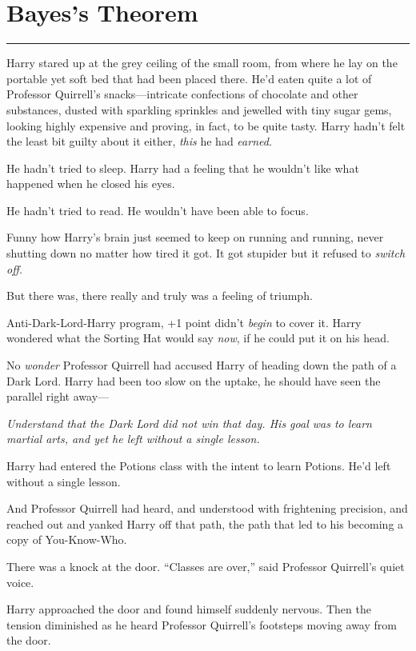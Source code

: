 \chapter{Bayes's Theorem}

\begin{center}\rule{3in}{0.4pt}\end{center}

Harry stared up at the grey ceiling of the small room, from where he lay
on the portable yet soft bed that had been placed there. He'd eaten
quite a lot of Professor Quirrell's snacks---intricate confections of
chocolate and other substances, dusted with sparkling sprinkles and
jewelled with tiny sugar gems, looking highly expensive and proving, in
fact, to be quite tasty. Harry hadn't felt the least bit guilty about it
either, \emph{this} he had \emph{earned}.

He hadn't tried to sleep. Harry had a feeling that he wouldn't like what
happened when he closed his eyes.

He hadn't tried to read. He wouldn't have been able to focus.

Funny how Harry's brain just seemed to keep on running and running,
never shutting down no matter how tired it got. It got stupider but it
refused to \emph{switch off.}

But there was, there really and truly was a feeling of triumph.

Anti-Dark-Lord-Harry program, +1 point didn't \emph{begin} to cover it.
Harry wondered what the Sorting Hat would say \emph{now}, if he could
put it on his head.

No \emph{wonder} Professor Quirrell had accused Harry of heading down
the path of a Dark Lord. Harry had been too slow on the uptake, he
should have seen the parallel right away---

\emph{Understand that the Dark Lord did not win that day. His goal was
to learn martial arts, and yet he left without a single lesson.}

Harry had entered the Potions class with the intent to learn Potions.
He'd left without a single lesson.

And Professor Quirrell had heard, and understood with frightening
precision, and reached out and yanked Harry off that path, the path that
led to his becoming a copy of You-Know-Who.

There was a knock at the door. ``Classes are over,'' said Professor
Quirrell's quiet voice.

Harry approached the door and found himself suddenly nervous. Then the
tension diminished as he heard Professor Quirrell's footsteps moving
away from the door.

